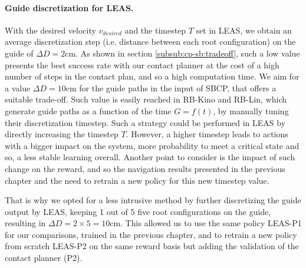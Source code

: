\paragraph{Guide discretization for LEAS.\label{par:cpsb:discussion_guide_discretization}}
With the desired velocity $v_{desired}$ and the timestep $T$ set in LEAS, we obtain an average discretization step (i.e. distance between each root configuration) on the guide of $\Delta D=2$cm. 
As shown in section \ref{subsub:cp-sb:tradeoff}, such a low value presents the best success rate with our contact planner at the cost of a high number of steps in the contact plan, and so a high computation time. We aim for a value $\Delta D=10$cm for the guide paths in the input of SBCP, that offers a suitable trade-off.
Such value is easily reached in RB-Kino and RB-Lin, which generate guide paths as a function of the time $G=f(t)$, by manually tuning their discretization timestep.
Such a strategy could be performed in LEAS by directly increasing the timestep $T$.
However, a higher timestep leads to actions with a bigger impact on the system, more probability to meet a critical state and so, a less stable learning overall.
Another point to consider is the impact of such change on the reward, and so the navigation results presented in the previous chapter and the need to retrain a new policy for this new timestep value.

That is why we opted for a less intrusive method by further discretizing the guide output by LEAS, keeping 1 out of 5 five root configurations on the guide, resulting in $\Delta D=2 \times 5=10$cm.
This allowed us to use the same policy LEAS-P1 for our comparisons, trained in the previous chapter, and to retrain a new policy from scratch LEAS-P2 on the same reward basis but adding the validation of the contact planner (P2).

